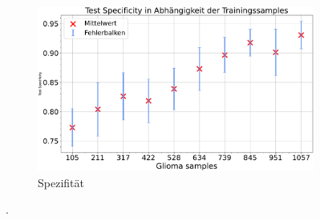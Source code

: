 \begin{figure}[htbp]
  \begin{subfigure}[b]{0.48\textwidth}
    \centering
    \includegraphics[width=\textwidth]{plots/Reduzierung-Gli + Balnce_Specificity_mean.pdf}
    \caption{Spezifität}
    \label{fig:gli-red-spec}
  \end{subfigure}
  \caption{.}
  \label{fig:gli-men-gliored}
\end{figure}


